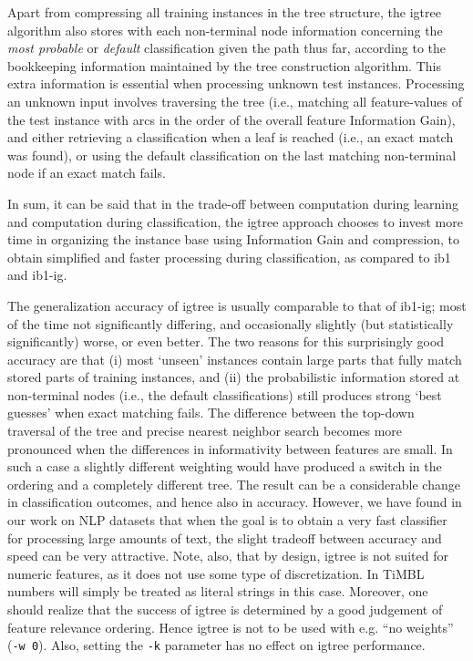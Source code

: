 \documentclass{report}
\begin{document}
Apart from compressing all training instances in the tree structure,
the {\sc igtree} algorithm also stores with each non-terminal node
information concerning the {\em most probable} or {\em default}
classification given the path thus far, according to the bookkeeping
information maintained by the tree construction algorithm. This extra
information is essential when processing unknown test instances.
Processing an unknown input involves traversing the tree (i.e.,
matching all feature-values of the test instance with arcs in the
order of the overall feature Information Gain), and either retrieving
a classification when a leaf is reached (i.e., an exact match was
found), or using the default classification on the last matching
non-terminal node if an exact match fails.

In sum, it can be said that in the trade-off between computation
during learning and computation during classification, the {\sc
igtree} approach chooses to invest more time in organizing the
instance base using Information Gain and compression, to obtain
simplified and faster processing during classification,
as compared to {\sc ib1} and {\sc ib1-ig}.
 
The generalization accuracy of {\sc igtree} is usually comparable to
that of {\sc ib1-ig}; most of the time not significantly differing,
and occasionally slightly (but statistically significantly) worse, or
even better.  The two reasons for this surprisingly good accuracy are
that (i) most `unseen' instances contain large parts that
fully match stored parts of training instances, and (ii) the
probabilistic information stored at non-terminal nodes (i.e., the
default classifications) still produces strong `best guesses' when
exact matching fails. The difference between the top-down traversal of
the tree and precise nearest neighbor search becomes more pronounced
when the differences in informativity between features are small. In
such a case a slightly different weighting would have produced a
switch in the ordering and a completely different tree. The result can
be a considerable change in classification outcomes, and hence also in
accuracy. However, we have found in our work on NLP datasets that when
the goal is to obtain a very fast classifier for processing large
amounts of text, the slight tradeoff between accuracy and speed can be
very attractive. Note, also, that by design, {\sc igtree} is not
suited for numeric features, as it does not use some type of
discretization. In TiMBL numbers will simply be treated as literal
strings in this case. Moreover, one should realize that the success of
{\sc igtree} is determined by a good judgement of feature relevance
ordering. Hence {\sc igtree} is not to be used with e.g. ``no
weights'' ({\tt -w 0}). Also, setting the {\tt -k} parameter has no
effect on {\sc igtree} performance.
\end{document}
